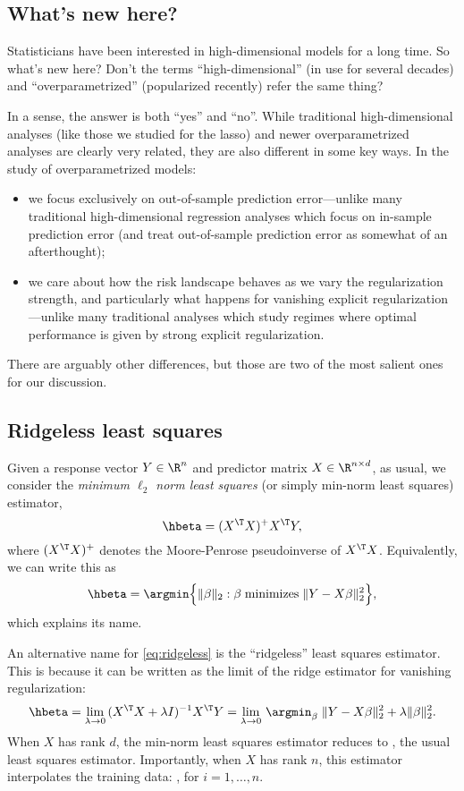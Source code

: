 \documentclass{article}
\begin{document}
\subsection{What's new here?}

Statisticians have been interested in high-dimensional models for a long
time. So what's new here? Don't the terms ``high-dimensional'' (in use for
several decades) and ``overparametrized'' (popularized recently) refer the same
thing?    

In a sense, the answer is both ``yes'' and ``no''. While traditional
high-dimensional analyses (like those we studied for the lasso) and newer
overparametrized analyses are clearly very related, they are also different in
some key ways. In the study of overparametrized models:
\begin{itemize}
\item we focus exclusively on out-of-sample prediction error---unlike many 
  traditional high-dimensional regression analyses which focus on in-sample
  prediction error (and treat out-of-sample prediction error as somewhat of an 
  afterthought);  
\item we care about how the risk landscape behaves as we vary the regularization  
  strength, and particularly what happens for vanishing explicit
  regularization---unlike many traditional analyses which study regimes where
  optimal performance is given by strong explicit regularization.   
\end{itemize}
There are arguably other differences, but those are two of the most salient ones 
for our discussion.

\subsection{Ridgeless least squares}

Given a response vector $Y \in \R^n$ and predictor matrix $X \in \R^{n \times
  d}$, as usual, we consider the \emph{minimum $\ell_2$ norm least squares} 
(or simply min-norm least squares) estimator,
\begin{equation}
\label{eq:ridgeless}
\hbeta = (X^\T X)^+ X^\T Y,
\end{equation}
where $(X^\T X)^+$ denotes the Moore-Penrose pseudoinverse of $X^\T X$.
Equivalently, we can write this as
\[
\hbeta = \argmin \Big\{ \|\beta\|_2 : \beta \; \text{minimizes} \; \|Y - X
\beta\|_2^2 \Big\},   
\]
which explains its name.  

An alternative name for \eqref{eq:ridgeless} is the ``ridgeless'' least squares 
estimator. This is because it can be written as the limit of the ridge estimator
for vanishing regularization:  
\[
\hbeta = \lim_{\lambda \to 0} \, (X^\T X + \lambda I)^{-1} X^\T Y =   
\lim_{\lambda \to 0} \, \argmin_\beta \; \|Y - X\beta\|_2^2 + \lambda 
\|\beta\|_2^2.   
\]
When $X$ has rank $d$, the min-norm least squares estimator reduces to
, the usual least squares estimator.
Importantly, when $X$ has rank $n$, this estimator interpolates the training 
data: , for $i=1,\dots,n$.   
\end{document}
